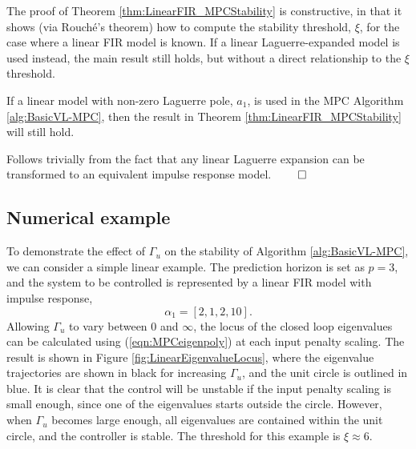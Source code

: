 The proof of Theorem \ref{thm:LinearFIR_MPCStability} is constructive, in that it shows (via Rouch{\'e}'s theorem) how to compute the stability threshold, $\xi$, for the case where a linear FIR model is known. If a linear Laguerre-expanded model is used instead, the main result still holds, but without a direct relationship to the $\xi$ threshold. 

\begin{corollary}
If a linear model with non-zero Laguerre pole, $a_1$, is used in the MPC Algorithm \ref{alg:BasicVL-MPC}, then the result in Theorem \ref{thm:LinearFIR_MPCStability} will still hold. 
\end{corollary}

\begin{proof*}
Follows trivially from the fact that any linear Laguerre expansion can be transformed to an equivalent impulse response model.  \hfill $\qed$
\end{proof*}

\subsection{Numerical example}

To demonstrate the effect of $\Gamma_u$ on the stability of Algorithm \ref{alg:BasicVL-MPC}, we can consider a simple linear example. The prediction horizon is set as $p=3$, and the system to be controlled is represented by a linear FIR model with impulse response,
\begin{equation}
\alpha_1 = [2, 1, 2, 10].
\end{equation}
Allowing $\Gamma_u$ to vary between 0 and $\infty$, the locus of the closed loop eigenvalues can be calculated using (\ref{eqn:MPCeigenpoly}) at each input penalty scaling. The result is shown in Figure \ref{fig:LinearEigenvalueLocus}, where the eigenvalue trajectories are shown in black for increasing $\Gamma_u$, and the unit circle is outlined in blue. It is clear that the control will be unstable if the input penalty scaling is small enough, since one of the eigenvalues starts outside the circle. However, when $\Gamma_u$ becomes large enough, all eigenvalues are contained within the unit circle, and the controller is stable. The threshold for this example is $\xi \approx 6$.

